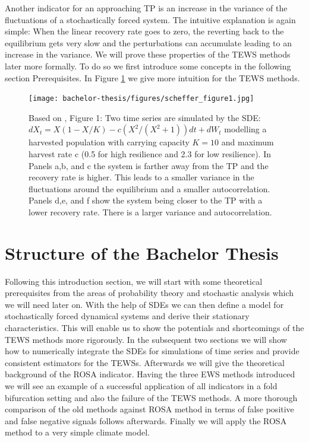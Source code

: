 \documentclass[%
thesis=student,%
coverpage=false,%
titlepage=false,%
headmarks=true, %
english,%
font=libertine, %
math=newpxtx, %
BCOR=5mm,%
coverBCOR=11mm%
]{tumbook}
\begin{document}
Another indicator for an approaching TP is an increase in the variance of the fluctuations of a stochastically forced system. The intuitive explanation is again simple: When the linear recovery rate goes to zero, the reverting back to the equilibrium gets very slow and the perturbations can accumulate leading to an increase in the variance. 
We will prove these properties of the TEWS methods later more formally. To do so we first introduce some concepts in the following section Prerequisites. In Figure \ref{fig:scheffer_fig_1_reimp} we give more intuition for the TEWS methods. \\



\begin{figure}[h]
    \centering
    \texttt{[image: bachelor-thesis/figures/scheffer\_figure1.jpg]}
    \caption{Based on \cite{Scheffer:2009}, Figure 1:
    Two time series are simulated by the SDE: $dX_{t}=X(1-X/K)-c(X^2/(X^2+1))dt + dW_{t}$ modelling a harvested population with carrying capacity $K = 10$ and maximum harvest rate c (0.5 for high resilience and 2.3 for low resilience). In Panels a,b, and c the system is farther away from the TP and the recovery rate is higher. This leads to a smaller variance in the fluctuations around the equilibrium and a smaller autocorrelation. Panels d,e, and f show the system being closer to the TP with a lower recovery rate. There is a larger variance and autocorrelation.}
    \label{fig:scheffer_fig_1_reimp}
\end{figure}


\section{Structure of the Bachelor Thesis}
Following this introduction section, we will start with some theoretical prerequisites from the areas of probability theory and stochastic analysis which we will need later on. With the help of SDEs we can then define a model for stochastically forced dynamical systems and derive their stationary characteristics. This will enable us to show the potentials and shortcomings of the TEWS methods more rigorously. In the subsequent two sections we will show how to numerically integrate the SDEs for simulations of time series and provide consistent estimators for the TEWSs. Afterwards we will give the theoretical background of the ROSA indicator. Having the three EWS methods introduced we will see an example of a successful application of all indicators in a fold bifurcation setting and also the failure of the TEWS methods. A more thorough comparison of the old methods against ROSA method in terms of false positive and false negative signals follows afterwards. Finally we will apply the ROSA method to a very simple climate model.
\end{document}
